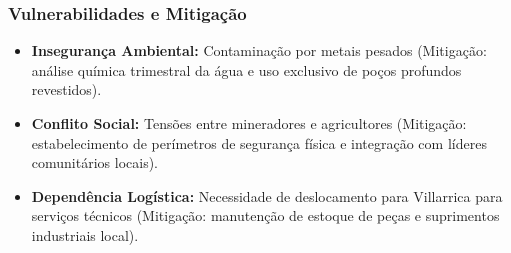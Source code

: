 \subsubsection{Vulnerabilidades e
Mitigação}

\begin{itemize}
\tightlist
\item
  \textbf{Insegurança Ambiental:} Contaminação por metais pesados
  (Mitigação: análise química trimestral da água e uso exclusivo de
  poços profundos revestidos).
\item
  \textbf{Conflito Social:} Tensões entre mineradores e agricultores
  (Mitigação: estabelecimento de perímetros de segurança física e
  integração com líderes comunitários locais).
\item
  \textbf{Dependência Logística:} Necessidade de deslocamento para
  Villarrica para serviços técnicos (Mitigação: manutenção de estoque de
  peças e suprimentos industriais local).
\end{itemize}

